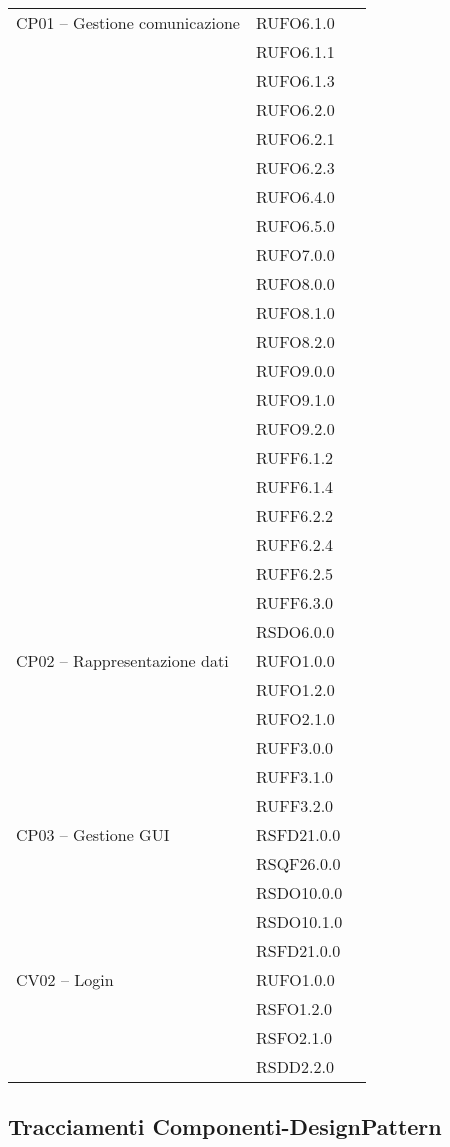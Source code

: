 \begin{center}
\begin{longtable}{lp{}l}
CP01 -- Gestione comunicazione & RUFO6.1.0\\
& RUFO6.1.1\\
& RUFO6.1.3\\
& RUFO6.2.0\\
& RUFO6.2.1\\
& RUFO6.2.3\\
& RUFO6.4.0\\
& RUFO6.5.0\\
& RUFO7.0.0\\
& RUFO8.0.0\\
& RUFO8.1.0\\
& RUFO8.2.0\\
& RUFO9.0.0\\
& RUFO9.1.0\\
& RUFO9.2.0\\
& RUFF6.1.2\\
& RUFF6.1.4\\
& RUFF6.2.2\\
& RUFF6.2.4\\
& RUFF6.2.5\\
& RUFF6.3.0\\
& RSDO6.0.0\\
CP02 -- Rappresentazione dati & RUFO1.0.0\\
& RUFO1.2.0\\
& RUFO2.1.0\\
& RUFF3.0.0\\
& RUFF3.1.0\\
& RUFF3.2.0\\
CP03 -- Gestione GUI & RSFD21.0.0\\
& RSQF26.0.0\\
& RSDO10.0.0\\
& RSDO10.1.0\\
& RSFD21.0.0\\
CV02 -- Login & RUFO1.0.0\\
& RSFO1.2.0\\
& RSFO2.1.0\\
& RSDD2.2.0\\
\bottomrule
\end{longtable}
\end{center}
\subsection{Tracciamenti Componenti-DesignPattern}\label{sec:tracCompDp}

